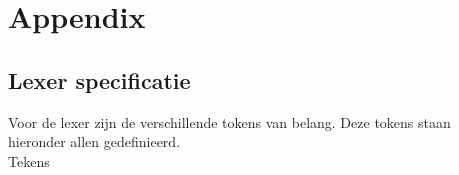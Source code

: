 \chapter{Appendix} %
\label{cha:appendix}
\section{Lexer specificatie} %
\label{sec:lexer_specificatie}
Voor de lexer zijn de verschillende tokens van belang. Deze tokens staan hieronder allen gedefinieerd. \\ 

Tekens
\begin{description}
    \item {}      
    \item {}      \tab{:}
    \item {}  \tab{;}
    \item {}     \tab{(} 
    \item {}     \tab{)} 
    \item {}     \tab{[}
    \item {}     \tab{]}
    \item {}     \tab{\{}
    \item {}     \tab{\}}
    \item {}      \tab{,}
    \item {} 
    \item {}       
    \item {}       
    \item {}        
\end{description}

\clearpage

